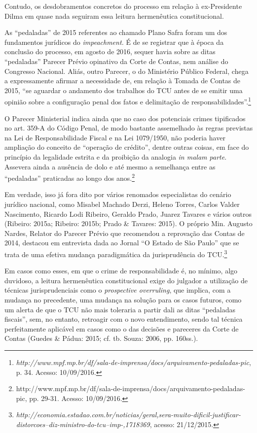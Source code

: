 Contudo, os desdobramentos concretos do processo em relação à
ex-Presidente Dilma em quase nada seguiram essa leitura hermenêutica
constitucional.

As ``pedaladas'' de 2015 referentes ao chamado Plano Safra foram um dos
fundamentos jurídicos do \emph{impeachment.} É de se registrar que à
época da conclusão do processo, em agosto de 2016, sequer havia sobre as
ditas ``pedaladas'' Parecer Prévio opinativo da Corte de Contas, nem
análise do Congresso Nacional. Aliás, outro Parecer, o do Ministério
Público Federal, chega a expressamente afirmar a necessidade de, em
relação à Tomada de Contas de 2015, ``se aguardar o andamento dos
trabalhos do TCU antes de se emitir uma opinião sobre a configuração
penal dos fatos e delimitação de responsabilidades''.\footnote{\emph{http://www.mpf.mp.br/df/sala-de-imprensa/docs/arquivamento-pedaladas-pic},
  p. 34. Acesso: 10/09/2016.}

O Parecer Ministerial indica ainda que no caso dos potenciais crimes
tipificados no art. 359-A do Código Penal, de modo bastante assemelhado
às regras previstas na Lei de Responsabilidade Fiscal e na Lei
1079/1950, não poderia haver ampliação do conceito de ``operação de
crédito'', dentre outras coisas, em face do princípio da legalidade
estrita e da proibição da analogia \emph{in malam parte}. Assevera ainda
a ausência de dolo e até mesmo a semelhança entre as ``pedaladas''
praticadas ao longo dos anos.\footnote{http://www.mpf.mp.br/df/sala-de-imprensa/docs/arquivamento-pedaladas-pic,
  pp. 29-31. Acesso: 10/09/2016.}

Em verdade, isso já fora dito por vários renomados especialistas do
cenário jurídico nacional, como Misabel Machado Derzi, Heleno Torres,
Carlos Valder Nascimento, Ricardo Lodi Ribeiro, Geraldo Prado, Juarez
Tavares e vários outros (Ribeiro: 2015a; Ribeiro: 2015b; Prado \&
Tavares: 2015). O próprio Min. Augusto Nardes, Relator do Parecer Prévio
que recomendou a reprovação das Contas de 2014, destacou em entrevista
dada ao Jornal ``O Estado de São Paulo'' que se trata de uma efetiva
mudança paradigmática da jurisprudência do TCU.\footnote{\emph{http://economia.estadao.com.br/noticias/geral,sera-muito-dificil-justificar-distorcoes--diz-ministro-do-tcu--imp-,1718369},
  acesso: 21/12/2015.}

Em casos como esses, em que o crime de responsabilidade é, no mínimo,
algo duvidoso, a leitura hermenêutica constitucional exige do julgador a
utilização de técnicas jurisprudenciais como o \emph{prospective
overruling}, que implica, com a mudança no precedente, uma mudança na
solução para os casos futuros, como um alerta de que o TCU não mais
toleraria a partir dali as ditas ``pedaladas fiscais'', sem, no entanto,
retroagir com o novo entendimento, sendo tal técnica perfeitamente
aplicável em casos como o das decisões e pareceres da Corte de Contas
(Guedes \& Pádua: 2015; cf. tb. Souza: 2006, pp. 160ss.).

